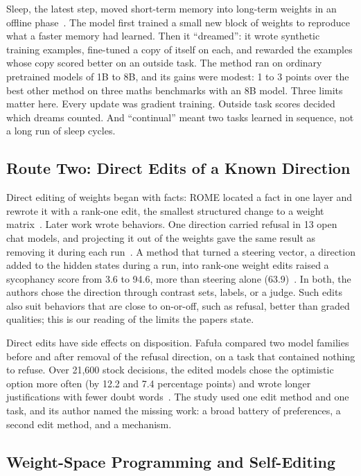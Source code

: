 \documentclass[journal]{IEEEtran}
\begin{document}
Sleep, the latest step, moved short-term memory into long-term weights in an offline phase~\cite{Behrouz2026}. The model first trained a small new block of weights to reproduce what a faster memory had learned. Then it ``dreamed'': it wrote synthetic training examples, fine-tuned a copy of itself on each, and rewarded the examples whose copy scored better on an outside task. The method ran on ordinary pretrained models of 1B to 8B, and its gains were modest: 1 to 3 points over the best other method on three maths benchmarks with an 8B model. Three limits matter here. Every update was gradient training. Outside task scores decided which dreams counted. And ``continual'' meant two tasks learned in sequence, not a long run of sleep cycles.

\subsection{Route Two: Direct Edits of a Known Direction}\label{sec:6.2}

Direct editing of weights began with facts: ROME located a fact in one layer and rewrote it with a rank-one edit, the smallest structured change to a weight matrix~\cite{Meng2022}. Later work wrote behaviors. One direction carried refusal in 13 open chat models, and projecting it out of the weights gave the same result as removing it during each run~\cite{Arditi2024}. A method that turned a steering vector, a direction added to the hidden states during a run, into rank-one weight edits raised a sycophancy score from 3.6 to 94.6, more than steering alone (63.9)~\cite{Perin2026}. In both, the authors chose the direction through contrast sets, labels, or a judge. Such edits also suit behaviors that are close to on-or-off, such as refusal, better than graded qualities; this is our reading of the limits the papers state.

Direct edits have side effects on disposition. Fafuła compared two model families before and after removal of the refusal direction, on a task that contained nothing to refuse. Over 21,600 stock decisions, the edited models chose the optimistic option more often (by 12.2 and 7.4 percentage points) and wrote longer justifications with fewer doubt words~\cite{Fafula2026}. The study used one edit method and one task, and its author named the missing work: a broad battery of preferences, a second edit method, and a mechanism.

\subsection{Weight-Space Programming and Self-Editing}\label{sec:6.3}
\end{document}
